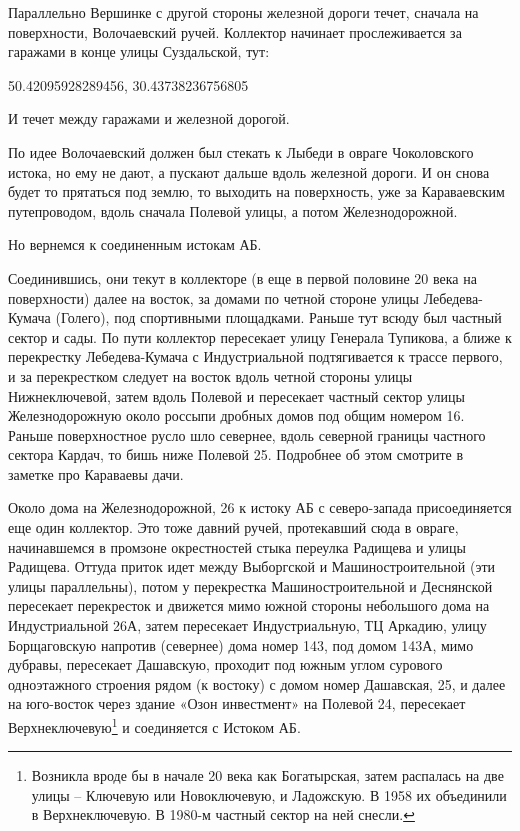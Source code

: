 Параллельно Вершинке с другой стороны железной дороги течет, сначала на поверхности, Волочаевский ручей. Коллектор начинает прослеживается за гаражами в конце улицы Суздальской, тут: 

50.42095928289456, 30.43738236756805

И течет между гаражами и железной дорогой.

По идее Волочаевский должен был стекать к Лыбеди в овраге Чоколовского истока, но ему не дают, а пускают дальше вдоль железной дороги. И он снова будет то прятаться под землю, то выходить на поверхность, уже за Караваевским путепроводом, вдоль сначала Полевой улицы, а потом Железнодорожной.

Но вернемся к соединенным истокам АБ.

Соединившись, они текут в коллекторе (в еще в первой половине 20 века на поверхности) далее на восток, за домами по четной стороне улицы Лебедева-Кумача (Голего), под спортивными площадками. Раньше тут всюду был частный сектор и сады. По пути коллектор пересекает улицу Генерала Тупикова, а ближе к перекрестку Лебедева-Кумача с Индустриальной подтягивается к трассе первого, и за перекрестком следует на восток вдоль четной стороны улицы Нижнеключевой, затем вдоль Полевой и пересекает частный сектор улицы Железнодорожную около россыпи дробных домов под общим номером 16. Раньше поверхностное русло шло севернее, вдоль северной границы частного сектора Кардач, то бишь ниже Полевой 25. Подробнее об этом смотрите в заметке про Караваевы дачи.

Около дома на Железнодорожной, 26 к истоку АБ с северо-запада присоединяется еще один коллектор. Это тоже давний ручей, протекавший сюда в овраге, начинавшемся в промзоне окрестностей стыка переулка Радищева и улицы Радищева. Оттуда приток идет между Выборгской и Машиностроительной (эти улицы параллельны), потом у перекрестка Машиностроительной и Деснянской пересекает перекресток и движется мимо южной стороны небольшого дома на Индустриальной 26А, затем пересекает Индустриальную, ТЦ Аркадию, улицу Борщаговскую напротив (севернее) дома номер 143, под домом 143А, мимо дубравы, пересекает Дашавскую, проходит под южным углом сурового одноэтажного строения рядом (к востоку) с домом номер Дашавская, 25, и далее на юго-восток через здание «Озон инвестмент» на Полевой 24, пересекает Верхнеключевую\footnote{Возникла вроде бы в начале 20 века как Богатырская, затем распалась на две улицы – Ключевую или Новоключевую, и Ладожскую. В 1958 их объединили в Верхнеключевую. В 1980-м частный сектор на ней снесли.} и соединяется с Истоком АБ.

